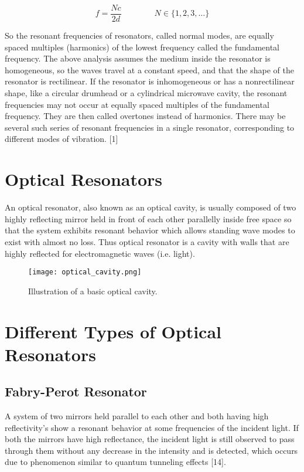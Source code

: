 $${\displaystyle f={\frac {Nc}{2d}}\qquad \qquad N\in \{1,2,3,\dots \}}$$

So the resonant frequencies of resonators, called normal modes, are equally spaced multiples (harmonics) of the lowest frequency called the fundamental frequency. The above analysis assumes the medium inside the resonator is homogeneous, so the waves travel at a constant speed, and that the shape of the resonator is rectilinear. If the resonator is inhomogeneous or has a nonrectilinear shape, like a circular drumhead or a cylindrical microwave cavity, the resonant frequencies may not occur at equally spaced multiples of the fundamental frequency. They are then called overtones instead of harmonics. There may be several such series of resonant frequencies in a single resonator, corresponding to different modes of vibration. [1]

\section{Optical Resonators}
An optical resonator, also known as an optical cavity, is usually composed of two highly reflecting mirror held in front of each other parallelly inside free space so that the system exhibits resonant behavior which allows standing wave modes to exist with almost no loss. Thus optical resonator is a cavity with walls that are highly reflected for electromagnetic waves (i.e. light).

\begin{figure}[h]
\centering
\texttt{[image: optical\_cavity.png]}
\caption{Illustration of a basic optical cavity.}
\end{figure}

\section{Different Types of Optical Resonators}
\subsection{Fabry-Perot Resonator}
A system of two mirrors held parallel to each other and both having high reflectivity’s show a resonant behavior at some frequencies of the incident light. If both the mirrors have high reflectance, the incident light is still observed to pass through them without any decrease in the intensity and is detected, which occurs due to phenomenon similar to quantum tunneling effects [14].

